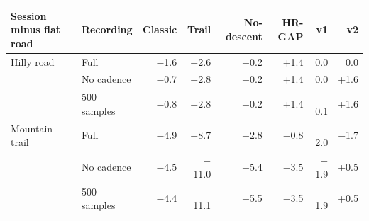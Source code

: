 \begin{tabular}{@{}llrrrrrr@{}}
\toprule
Session minus flat road & Recording & Classic & Trail & No-descent & HR-GAP & \ascent{} v1 & \ascent{} v2 \\
\midrule
Hilly road & Full & $-$1.6 & $-$2.6 & $-$0.2 & +1.4 & 0.0 & 0.0 \\
 & No cadence & $-$0.7 & $-$2.8 & $-$0.2 & +1.4 & 0.0 & +1.6 \\
 & 500 samples & $-$0.8 & $-$2.8 & $-$0.2 & +1.4 & $-$0.1 & +1.6 \\
\addlinespace[2pt]
Mountain trail & Full & $-$4.9 & $-$8.7 & $-$2.8 & $-$0.8 & $-$2.0 & $-$1.7 \\
 & No cadence & $-$4.5 & $-$11.0 & $-$5.4 & $-$3.5 & $-$1.9 & +0.5 \\
 & 500 samples & $-$4.4 & $-$11.1 & $-$5.5 & $-$3.5 & $-$1.9 & +0.5 \\
\bottomrule
\end{tabular}

